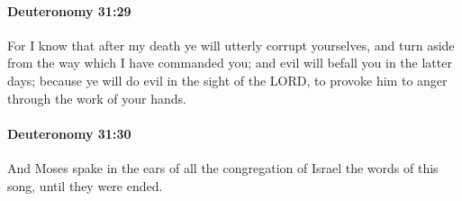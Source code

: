		\paragraph{Deuteronomy 31:29} %
			\label{DEUTERONOMY-31-29}

			For I know that after my death ye will utterly corrupt yourselves, and turn aside from the way which I have commanded you; and evil will befall you in the latter days; because ye will do evil in the sight of the LORD, to provoke him to anger through the work of your hands.


		\paragraph{Deuteronomy 31:30} %
			\label{DEUTERONOMY-31-30}

			And Moses spake in the ears of all the congregation of Israel the words of this song, until they were ended.

